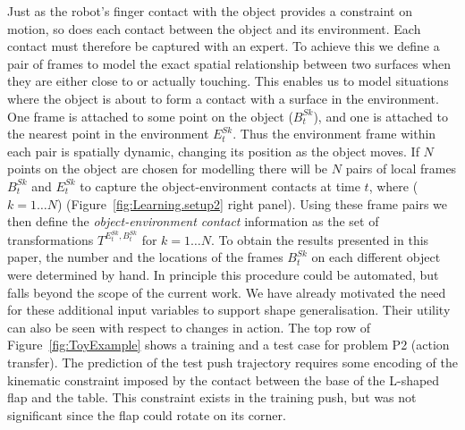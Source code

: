 Just as the robot's finger contact with the object provides a constraint on motion, so does each contact between the object and its environment. Each contact must therefore be captured with an expert. To achieve this we define a pair of frames to model the exact spatial relationship between two surfaces when they are either close to or actually touching. This enables us to model situations where the object is about to form a contact with a surface in the environment. One frame is attached to some point on the object ($B^{Sk}_t$), and one is attached to the nearest point in the environment $E^{Sk}_t$.  Thus the environment frame within each pair is spatially dynamic, changing its position as the object moves. If $N$ points on the object are chosen for modelling there will be $N$ pairs of local frames $B^{Sk}_t$ and $E^{Sk}_t$ to capture the object-environment contacts at time $t$, where ($k=1 \ldots N$) (Figure~\ref{fig:Learning.setup2} right panel). Using these frame pairs we then define the \textit{object-environment contact}
information as the set of transformations $T^{E^{Sk}_t,B^{Sk}_t}$ for $k=1 \ldots N$. To obtain the results presented in this paper, the number and the locations of the frames $B^{Sk}_t$ on each different object were determined by hand. In principle this procedure could be automated, but falls beyond the scope of the current work. We have already motivated the need for these additional input
variables to support shape generalisation. Their utility can also be seen with respect to changes in
action. The top row of Figure~\ref{fig:ToyExample} shows a training
and a test case for problem P2 (action transfer). The prediction of the test push trajectory requires some encoding of the kinematic constraint imposed by the contact between the base of the L-shaped flap and the table. This constraint exists in the training push, but was not significant since the flap could rotate on its corner.

